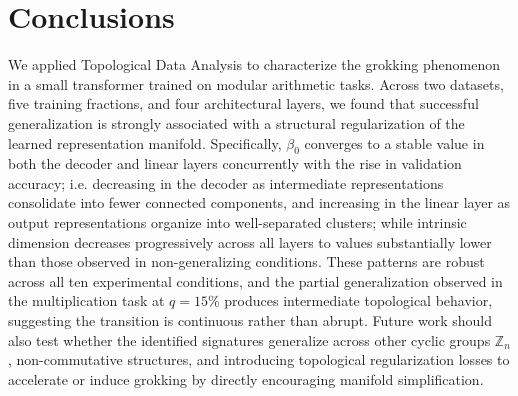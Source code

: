 \section{Conclusions}
\label{sec:conclusion}

We applied Topological Data Analysis to characterize the grokking phenomenon in a small transformer trained on modular arithmetic tasks. Across two datasets, five training fractions, and four architectural layers, we found that successful generalization is strongly associated with a structural regularization of the learned representation manifold. Specifically, $\beta_0$ converges to a stable value in both the decoder and linear layers concurrently with the rise in validation accuracy; i.e. decreasing in the decoder as intermediate representations consolidate into fewer connected components, and increasing in the linear layer as output representations organize into well-separated clusters; while intrinsic dimension decreases progressively across all layers to values substantially lower than those observed in non-generalizing conditions. These patterns are robust across all ten experimental conditions, and the partial generalization observed in the multiplication task at $q = 15\%$ produces intermediate topological behavior, suggesting the transition is continuous rather than abrupt. Future work should also test whether the identified signatures generalize across other cyclic groups $\mathbb{Z}_n$, non-commutative structures, and introducing topological regularization losses to accelerate or induce grokking by directly encouraging manifold simplification. 